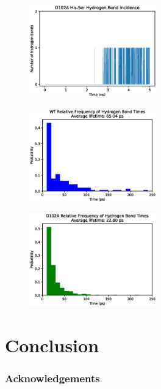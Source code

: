 \documentclass[11pt, twocolumn]{article}
\begin{document}
\begin{figure}[H]
    \centering
        \includegraphics[width=0.49\textwidth]{d102a_hbonds_his_ser.eps}
    \caption{}
\end{figure}

\begin{figure}[H]
    \centering
        \includegraphics[width=0.49\textwidth]{wt_hbond_times.eps}
    \caption{}
\end{figure}

\begin{figure}[H]
    \centering
        \includegraphics[width=0.49\textwidth]{d102a_hbond_times.eps}
    \caption{}
\end{figure}





\section{Conclusion}

\subsubsection*{Acknowledgements}
\end{document}
